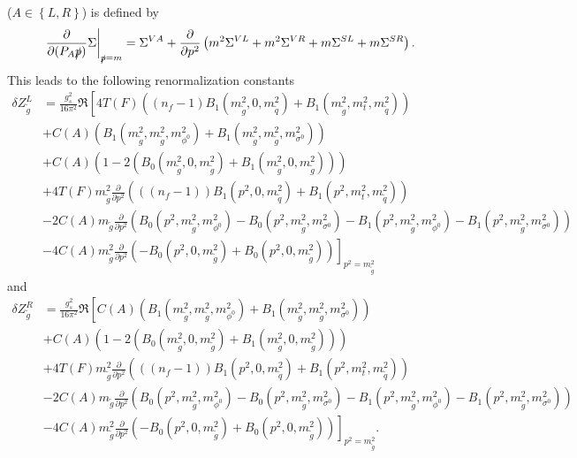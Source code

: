 ($A \in \left\{ L,R \right\}$) is defined by\cite{FormCalcManual}
\begin{align}
\left.\frac{\partial}{\partial (P_A\slashed{p})} \Sigma\right|_{\slashed{p} = m} = \Sigma^{VA} + \frac{\partial}{\partial p^2} \left( m^2 \Sigma^{VL} + m^2 \Sigma^{VR} + m \Sigma^{SL} + m \Sigma^{SR}\right).
\end{align}
This leads to the following renormalization constants
\begin{align}
\delta Z_{\tilde{g}}^L &= \frac{g_s^2}{16\pi^2}\Re \left[ 4T(F)\left( (n_f-1) B_1(m_{\tilde{g}}^2,0,m_{\tilde{q}}^2) + B_1(m_{\tilde{g}}^2,m_t^2,m_{\tilde{q}}^2) \right) \right.\nonumber\\
&+C(A) (B_1(m_{\tilde{g}}^2,m_{\tilde{g}}^2,m_{\phi^0}^2) + B_1(m_{\tilde{g}}^2,m_{\tilde{g}}^2,m_{\sigma^0}^2))\nonumber\\
&+C(A)(1-2(B_0(m_{\tilde{g}}^2,0,m_{\tilde{g}}^2) + B_1(m_{\tilde{g}}^2,0,m_{\tilde{g}}^2)))\nonumber\\
&+ 4T(F) m_{\tilde{g}}^2 \frac{\partial}{\partial p^2} \left( ((n_f-1))  B_1(p^2,0,m_{\tilde{q}}^2) +  B_1(p^2,m_t^2,m_{\tilde{q}}^2) \right)\nonumber\\
&-2 C(A) m_{\tilde{g}} \frac{\partial}{\partial p^2} \left( B_0(p^2,m_{\tilde{g}}^2,m_{\phi^0}^2)-B_0(p^2,m_{\tilde{g}}^2,m_{\sigma^0}^2) - B_1(p^2,m_{\tilde{g}}^2,m_{\phi^0}^2) - B_1(p^2,m_{\tilde{g}}^2,m_{\sigma^0}^2) \right)\nonumber\\
&-4 C(A) m_{\tilde{g}}^2 \frac{\partial}{\partial p^2} \left.\left( -B_0(p^2,0,m_{\tilde{g}}^2) + B_0(p^2,0,m_{\tilde{g}}^2) \right)\right]_{p^2=m_{\tilde{g}}^2}
\end{align}
and 
\begin{align}
\delta Z_{\tilde{g}}^R &= \frac{g_s^2}{16\pi^2}\Re \left[C(A) (B_1(m_{\tilde{g}}^2,m_{\tilde{g}}^2,m_{\phi^0}^2) + B_1(m_{\tilde{g}}^2,m_{\tilde{g}}^2,m_{\sigma^0}^2)) \right.\nonumber\\
&+C(A)(1-2(B_0(m_{\tilde{g}}^2,0,m_{\tilde{g}}^2) + B_1(m_{\tilde{g}}^2,0,m_{\tilde{g}}^2)))\nonumber\\
&+ 4T(F) m_{\tilde{g}}^2 \frac{\partial}{\partial p^2} \left( ((n_f-1))  B_1(p^2,0,m_{\tilde{q}}^2) +  B_1(p^2,m_t^2,m_{\tilde{q}}^2) \right)\nonumber\\
&-2 C(A) m_{\tilde{g}} \frac{\partial}{\partial p^2} \left( B_0(p^2,m_{\tilde{g}}^2,m_{\phi^0}^2)-B_0(p^2,m_{\tilde{g}}^2,m_{\sigma^0}^2) - B_1(p^2,m_{\tilde{g}}^2,m_{\phi^0}^2) - B_1(p^2,m_{\tilde{g}}^2,m_{\sigma^0}^2) \right)\nonumber\\
&-4 C(A) m_{\tilde{g}}^2 \frac{\partial}{\partial p^2} \left.\left( -B_0(p^2,0,m_{\tilde{g}}^2) + B_0(p^2,0,m_{\tilde{g}}^2) \right)\right]_{p^2=m_{\tilde{g}}^2}.
\end{align}
